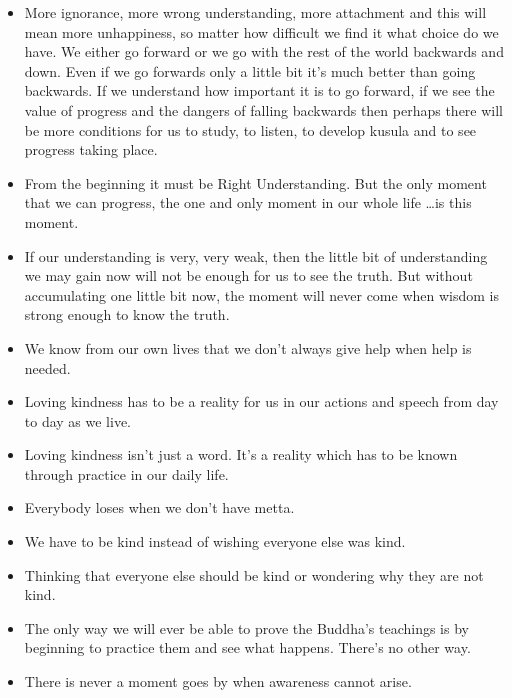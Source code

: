 \documentclass{article}
\begin{document}
\begin{itemize}
\item 
  More ignorance, more wrong understanding, more attachment and this
  will mean more unhappiness, so matter how difficult we find it what
  choice do we have. We either go forward or we go with the rest of
  the world backwards and down. Even if we go forwards only a little
  bit it's much better than going backwards. If we understand how
  important it is to go forward, if we see the value of progress and
  the dangers of falling backwards then perhaps there will be more
  conditions for us to study, to listen, to develop kusula and to see
  progress taking place.

\item 
  From the beginning it must be Right Understanding. But the only
  moment that we can progress, the one and only moment in our whole
  life \ldots{}is this moment.

\item 
  If our understanding is very, very weak, then the little bit of
  understanding we may gain now will not be enough for us to see the
  truth. But without accumulating one little bit now, the moment will
  never come when wisdom is strong enough to know the truth.

\item 
  We know from our own lives that we don't always give help when help
  is needed.

\item 
  Loving kindness has to be a reality for us in our actions and
  speech from day to day as we live.

\item 
  Loving kindness isn't just a word. It's a reality which has to be
  known through practice in our daily life.

\item 
  Everybody loses when we don't have metta.

\item 
  We have to be kind instead of wishing everyone else was kind.

\item 
  Thinking that everyone else should be kind or wondering why they
  are not kind.

\item 
  The only way we will ever be able to prove the Buddha's teachings
  is by beginning to practice them and see what happens. There's no
  other way.

\item 
  There is never a moment goes by when awareness cannot arise.


\end{itemize}
\end{document}
